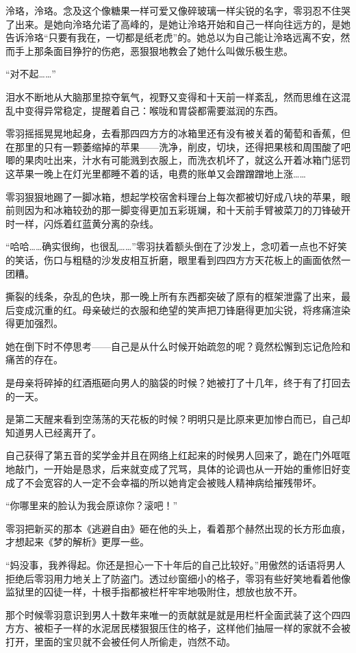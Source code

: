 \documentclass[UTF8, scheme = chinese, openany]{ctexbook}
\begin{document}
泠珞，泠珞。念及这个像糖果一样可爱又像碎玻璃一样尖锐的名字，零羽忍不住哭了出来。是她向泠珞允诺了高峰的，是她让泠珞开始和自己一样向往远方的，是她告诉泠珞“只要有我在，一切都是纸老虎”的。她总以为自己能让泠珞远离不安，然而手上那条面目狰狞的伤疤，恶狠狠地教会了她什么叫做乐极生悲。

“对不起……”

泪水不断地从大脑那里掠夺氧气，视野又变得和十天前一样紊乱，然而思维在这混乱中变得异常稳定，提醒着自己：喉咙和胃袋都需要滋润的东西。

零羽摇摇晃晃地起身，去看那四四方方的冰箱里还有没有被关着的葡萄和香蕉，但在那里的只有一颗萎缩掉的苹果——洗净，削皮，切块，还得把果核和周围酸了吧唧的果肉吐出来，汁水有可能溅到衣服上，而洗衣机坏了，就这么开着冰箱门惩罚这苹果一晚上在灯光里都睡不着的话，电费的账单又会蹭蹭蹭地上涨……

零羽狠狠地踢了一脚冰箱，想起学校宿舍料理台上每次都被切好成八块的苹果，眼前则因为和冰箱较劲的那一脚变得更加五彩斑斓，和十天前手臂被菜刀的刀锋破开时一样，闪烁着红蓝黄分离的杂线。

“哈哈……确实很绚，也很乱……”零羽扶着额头倒在了沙发上，念叨着一点也不好笑的笑话，伤口与粗糙的沙发皮相互折磨，眼里看到四四方方天花板上的画面依然一团糟。

撕裂的线条，杂乱的色块，那一晚上所有东西都突破了原有的框架泄露了出来，最后变成沉重的红。母亲破烂的衣服和绝望的笑声把刀锋磨得更加尖锐，将疼痛渲染得更加强烈。

她在倒下时不停思考——自己是从什么时候开始疏忽的呢？竟然松懈到忘记危险和痛苦的存在。

是母亲将碎掉的红酒瓶砸向男人的脑袋的时候？她被打了十几年，终于有了打回去的一天。

是第二天醒来看到空荡荡的天花板的时候？明明只是比原来更加惨白而已，自己却知道男人已经离开了。

自己获得了第五音的奖学金并且在网络上红起来的时候男人回来了，跪在门外哐哐地敲门，一开始是恳求，后来就变成了咒骂，具体的论调也从一开始的重修旧好变成了不会宽容的人一定不会幸福的所以她肯定会被贱人精神病给摧残带坏。

“你哪里来的脸认为我会原谅你？滚吧！”

零羽把新买的那本《逃避自由》砸在他的头上，看着那个赫然出现的长方形血痕，才想起来《梦的解析》更厚一些。

“妈没事，我养得起。你还是担心一下十年后的自己比较好。”用傲然的话语将男人拒绝后零羽用力地关上了防盗门。透过纱窗细小的格子，零羽有些好笑地看着他像监狱里的囚徒一样，十根手指都被栏杆牢牢地吸附住，想放也放不开。

那个时候零羽意识到男人十数年来唯一的贡献就是就是用栏杆全面武装了这个四四方方、被柜子一样的水泥居民楼狠狠压住的格子，这样他们抽屉一样的家就不会被打开，里面的宝贝就不会被任何人所偷走，岿然不动。
\end{document}
